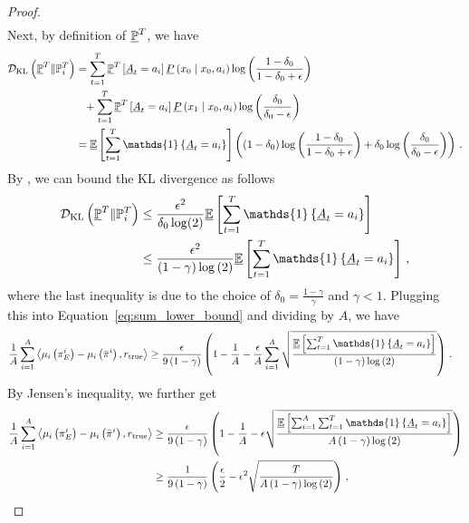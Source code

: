 \begin{proof}
\begin{align*}
    \end{align*}
    Next, by definition of $\underline{\mathbb{P}}^T$, we have
    \begin{align*}
        \KL \spr{\underline{\bbP}^T \| \bbP_i^T} &= \sumtT \underline{\bbP}^T \sbr{\underline{A}_t = a_i} \underline{P} \spr{x_0 \given x_0, a_i} \log \spr{\frac{1 - \delta_0}{1 - \delta_0 + \epsilon}} \\
        &\phantom{=}+ \sumtT \underline{\bbP}^T \sbr{\underline{A}_t = a_i} \underline{P} \spr{x_1 \given x_0, a_i} \log \spr{\frac{\delta_0}{\delta_0 - \epsilon}} \\
        &= \underline{\bbE} \sbr{\sumtT \mathds{1} \scbr{\underline{A}_t = a_i}} \spr{\spr{1 - \delta_0} \log \spr{\frac{1 - \delta_0}{1 - \delta_0 + \epsilon}} + \delta_0 \log \spr{\frac{\delta_0}{\delta_0 - \epsilon}}}\,.
    \end{align*}
    By \citealp[Lemma 20]{AJO08}, we can bound the KL divergence as follows
    \begin{align*}
        \KL \spr{\underline{\bbP}^T \| \bbP_i^T} &\leq \frac{\epsilon^2}{\delta_0 \log(2)} \underline{\bbE} \sbr{\sumtT \mathds{1} \scbr{\underline{A}_t = a_i}} \\
        &\leq \frac{\epsilon^2}{\spr{1 - \gamma} \log \spr{2}} \underline{\bbE} \sbr{\sumtT \mathds{1} \scbr{\underline{A}_t = a_i}}\,,
    \end{align*}
    where the last inequality is due to the choice of $\delta_0 = \frac{1 - \gamma}{\gamma}$ and $\gamma < 1$. Plugging this into Equation~\eqref{eq:sum_lower_bound} and dividing by $A$, we have
    \begin{align*}
        \frac1A \sum_{i = 1}^A \inp{\mu_i \spr{\experti} - \mu_i \spr{\bar\pi^i}, \true} &\geq \frac{\epsilon}{9 \spr{1 - \gamma}} \spr{1 - \frac1A - \frac{\epsilon}{A} \sum_{i=1}^A \sqrt{\frac{\underline{\bbE} \sbr{\sumtT \mathds{1} \scbr{\underline{A}_t = a_i}}}{\spr{1 - \gamma} \log \spr{2}}}}\,.
    \end{align*}
    By Jensen's inequality, we further get
    \begin{align*}
        \frac1A \sum_{i = 1}^A \inp{\mu_i \spr{\experti} - \mu_i \spr{\bar\pi^i}, \true} &\geq \frac{\epsilon}{9 \spr{1 - \gamma}} \spr{1 - \frac1A - \epsilon \sqrt{\frac{\underline{\bbE} \sbr{\sum_{i=1}^A \sumtT \mathds{1} \scbr{\underline{A}_t = a_i}}}{A \spr{1 - \gamma} \log \spr{2}}}} \\
        &\geq \frac{1}{9 \spr{1 - \gamma}} \spr{\frac{\epsilon}{2} - \epsilon^2 \sqrt{\frac{T}{A \spr{1 - \gamma} \log \spr{2}}}}\,,

\end{align*}
\end{proof}
